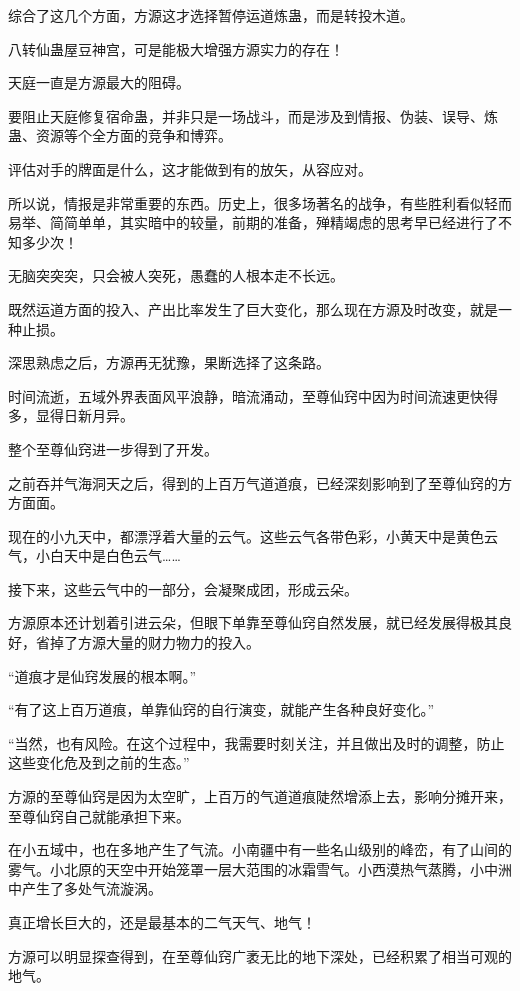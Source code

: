 \begin{this_body}
综合了这几个方面，方源这才选择暂停运道炼蛊，而是转投木道。

八转仙蛊屋豆神宫，可是能极大增强方源实力的存在！

天庭一直是方源最大的阻碍。

要阻止天庭修复宿命蛊，并非只是一场战斗，而是涉及到情报、伪装、误导、炼蛊、资源等个全方面的竞争和博弈。

评估对手的牌面是什么，这才能做到有的放矢，从容应对。

所以说，情报是非常重要的东西。历史上，很多场著名的战争，有些胜利看似轻而易举、简简单单，其实暗中的较量，前期的准备，殚精竭虑的思考早已经进行了不知多少次！

无脑突突突，只会被人突死，愚蠢的人根本走不长远。

既然运道方面的投入、产出比率发生了巨大变化，那么现在方源及时改变，就是一种止损。

深思熟虑之后，方源再无犹豫，果断选择了这条路。

时间流逝，五域外界表面风平浪静，暗流涌动，至尊仙窍中因为时间流速更快得多，显得日新月异。

整个至尊仙窍进一步得到了开发。

之前吞并气海洞天之后，得到的上百万气道道痕，已经深刻影响到了至尊仙窍的方方面面。

现在的小九天中，都漂浮着大量的云气。这些云气各带色彩，小黄天中是黄色云气，小白天中是白色云气……

接下来，这些云气中的一部分，会凝聚成团，形成云朵。

方源原本还计划着引进云朵，但眼下单靠至尊仙窍自然发展，就已经发展得极其良好，省掉了方源大量的财力物力的投入。

“道痕才是仙窍发展的根本啊。”

“有了这上百万道痕，单靠仙窍的自行演变，就能产生各种良好变化。”

“当然，也有风险。在这个过程中，我需要时刻关注，并且做出及时的调整，防止这些变化危及到之前的生态。”

方源的至尊仙窍是因为太空旷，上百万的气道道痕陡然增添上去，影响分摊开来，至尊仙窍自己就能承担下来。

在小五域中，也在多地产生了气流。小南疆中有一些名山级别的峰峦，有了山间的雾气。小北原的天空中开始笼罩一层大范围的冰霜雪气。小西漠热气蒸腾，小中洲中产生了多处气流漩涡。

真正增长巨大的，还是最基本的二气天气、地气！

方源可以明显探查得到，在至尊仙窍广袤无比的地下深处，已经积累了相当可观的地气。


\end{this_body}
